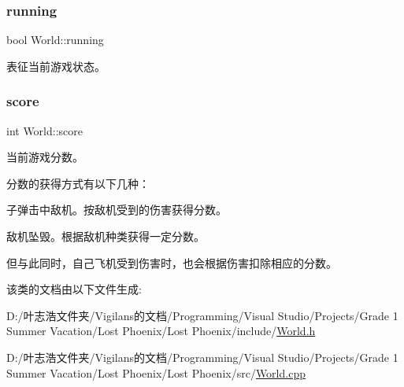\subsubsection{\texorpdfstring{running}{running}}
{\footnotesize\ttfamily bool World\+::running\hspace{0.3cm}{\ttfamily [private]}}



表征当前游戏状态。 

\mbox{\label{class_world_ae70b4ef5dd9cb9e7336169a25aaee39c}} 
\subsubsection{\texorpdfstring{score}{score}}
{\footnotesize\ttfamily int World\+::score}



当前游戏分数。 

分数的获得方式有以下几种：
\begin{DoxyEnumerate}
\item 子弹击中敌机。按敌机受到的伤害获得分数。
\item 敌机坠毁。根据敌机种类获得一定分数。
\end{DoxyEnumerate}

但与此同时，自己飞机受到伤害时，也会根据伤害扣除相应的分数。 

该类的文档由以下文件生成\+:\begin{DoxyCompactItemize}
\item 
D\+:/叶志浩文件夹/\+Vigilans的文档/\+Programming/\+Visual Studio/\+Projects/\+Grade 1 Summer Vacation/\+Lost Phoenix/\+Lost Phoenix/include/\hyperlink{_world_8h}{World.\+h}\item 
D\+:/叶志浩文件夹/\+Vigilans的文档/\+Programming/\+Visual Studio/\+Projects/\+Grade 1 Summer Vacation/\+Lost Phoenix/\+Lost Phoenix/src/\hyperlink{_world_8cpp}{World.\+cpp}\end{DoxyCompactItemize}
